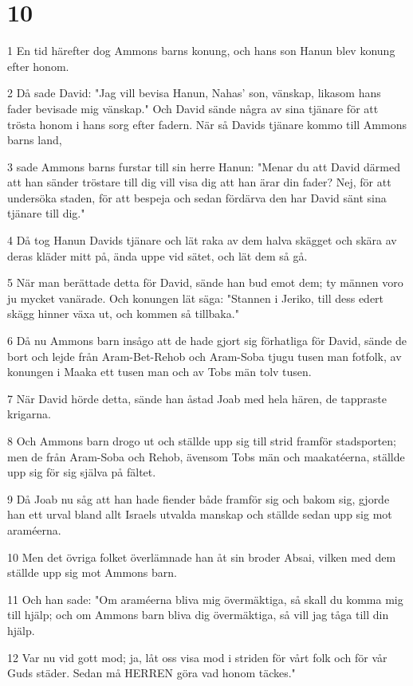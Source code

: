 \chapter{10}

\par 1 En tid härefter dog Ammons barns konung, och hans son Hanun blev konung efter honom.
\par 2 Då sade David: "Jag vill bevisa Hanun, Nahas' son, vänskap, likasom hans fader bevisade mig vänskap." Och David sände några av sina tjänare för att trösta honom i hans sorg efter fadern. När så Davids tjänare kommo till Ammons barns land,
\par 3 sade Ammons barns furstar till sin herre Hanun: "Menar du att David därmed att han sänder tröstare till dig vill visa dig att han ärar din fader? Nej, för att undersöka staden, för att bespeja och sedan fördärva den har David sänt sina tjänare till dig."
\par 4 Då tog Hanun Davids tjänare och lät raka av dem halva skägget och skära av deras kläder mitt på, ända uppe vid sätet, och lät dem så gå.
\par 5 När man berättade detta för David, sände han bud emot dem; ty männen voro ju mycket vanärade. Och konungen lät säga: "Stannen i Jeriko, till dess edert skägg hinner växa ut, och kommen så tillbaka."
\par 6 Då nu Ammons barn insågo att de hade gjort sig förhatliga för David, sände de bort och lejde från Aram-Bet-Rehob och Aram-Soba tjugu tusen man fotfolk, av konungen i Maaka ett tusen man och av Tobs män tolv tusen.
\par 7 När David hörde detta, sände han åstad Joab med hela hären, de tappraste krigarna.
\par 8 Och Ammons barn drogo ut och ställde upp sig till strid framför stadsporten; men de från Aram-Soba och Rehob, ävensom Tobs män och maakatéerna, ställde upp sig för sig själva på fältet.
\par 9 Då Joab nu såg att han hade fiender både framför sig och bakom sig, gjorde han ett urval bland allt Israels utvalda manskap och ställde sedan upp sig mot araméerna.
\par 10 Men det övriga folket överlämnade han åt sin broder Absai, vilken med dem ställde upp sig mot Ammons barn.
\par 11 Och han sade: "Om araméerna bliva mig övermäktiga, så skall du komma mig till hjälp; och om Ammons barn bliva dig övermäktiga, så vill jag tåga till din hjälp.
\par 12 Var nu vid gott mod; ja, låt oss visa mod i striden för vårt folk och för vår Guds städer. Sedan må HERREN göra vad honom täckes."
